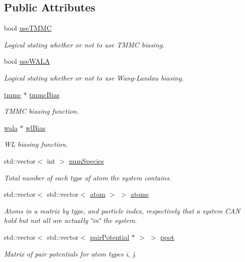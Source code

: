 \subsection*{Public Attributes}
\begin{DoxyCompactItemize}
\item 
bool \hyperlink{classsim_system_aa474a50b6353c8897331b1ab1ce53ab1}{use\+T\+M\+M\+C}
\begin{DoxyCompactList}\small\item\em Logical stating whether or not to use T\+M\+M\+C biasing. \end{DoxyCompactList}\item 
bool \hyperlink{classsim_system_aa83b00006b3919fb6e13f1bdeadece6a}{use\+W\+A\+L\+A}
\begin{DoxyCompactList}\small\item\em Logical stating whether or not to use Wang-\/\+Landau biasing. \end{DoxyCompactList}\item 
\hyperlink{classtmmc}{tmmc} $\ast$ \hyperlink{classsim_system_a13173f45a1e40a5f5a3552b0ebe15b54}{tmmc\+Bias}
\begin{DoxyCompactList}\small\item\em T\+M\+M\+C biasing function. \end{DoxyCompactList}\item 
\hyperlink{classwala}{wala} $\ast$ \hyperlink{classsim_system_a6dc8d9f89dfcfa247a59bc50889c49e7}{wl\+Bias}
\begin{DoxyCompactList}\small\item\em W\+L biasing function. \end{DoxyCompactList}\item 
std\+::vector$<$ int $>$ \hyperlink{classsim_system_a9eea865e6dc1cff377b1e79c4d9c23f0}{num\+Species}
\begin{DoxyCompactList}\small\item\em Total number of each type of atom the system contains. \end{DoxyCompactList}\item 
std\+::vector$<$ std\+::vector$<$ \hyperlink{classatom}{atom} $>$ $>$ \hyperlink{classsim_system_a90421b19082f7fb8fc23b7264b1161e4}{atoms}
\begin{DoxyCompactList}\small\item\em Atoms in a matrix by type, and particle index, respectively that a system C\+A\+N hold but not all are actually \char`\"{}in\char`\"{} the system. \end{DoxyCompactList}\item 
std\+::vector$<$ std\+::vector$<$ \hyperlink{classpair_potential}{pair\+Potential} $\ast$ $>$ $>$ \hyperlink{classsim_system_a8d6271751a62f61edcf57f773540a4a3}{ppot}
\begin{DoxyCompactList}\small\item\em Matrix of pair potentials for atom types i, j. \end{DoxyCompactList}\end{DoxyCompactItemize}


